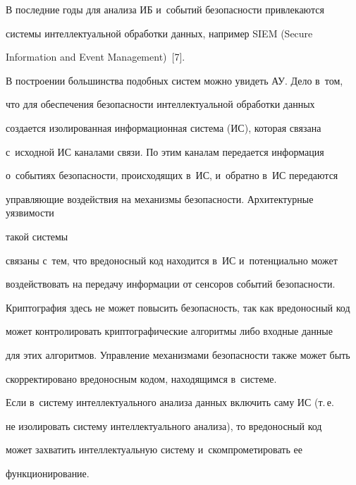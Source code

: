   


  В последние годы для анализа ИБ и~событий безопасности привлекаются 


сис\-те\-мы интеллектуальной обработки данных, например SIEM (Secure 


Information and Event Management)~[7]. 


  


  В построении большинства подобных систем можно увидеть АУ. Дело в~том, 


что для обеспечения безопасности интеллектуальной обработки данных 


создается изолированная информационная система (ИС), которая связана 


с~исходной ИС каналами связи. По этим каналам передается информация 


о~событиях без\-опас\-ности, происходящих в~ИС, и~обратно в~ИС передаются 


управляющие воздействия на механизмы безопасности. Архитектурные уязвимости 


такой сис\-те\-мы 


связаны с~тем, что вредоносный код находится в~ИС и~потенциально может 


воздействовать на передачу информации от сенсоров событий безопасности. 


Криптография здесь не может повысить безопасность, так как вредоносный код 


может контролировать криптографические алгоритмы либо входные данные 


для этих алгоритмов. Управление механизмами безопасности также может быть 


скорректировано вредоносным кодом, находящимся в~системе. 


  


  Если в~систему интеллектуального анализа данных включить саму ИС (т.\,е.\ 


не изолировать систему интеллектуального анализа), то вредоносный код 


может захватить интеллектуальную систему и~скомпрометировать ее 


функционирование.


{





}








